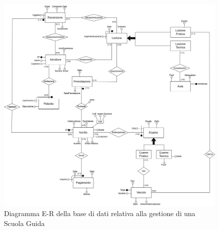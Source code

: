 \documentclass[10pt,twoside]{article}
\begin{document}
\begin{figure}[H]        
    \includegraphics[width=.88\linewidth]{img/ER_ScuolaGuida.drawio.png}\centering
    \caption{Diagramma E-R della base di dati relativa alla gestione di una Scuola Guida}
    \label{fig:diagrammaER}
\end{figure}
\end{document}
